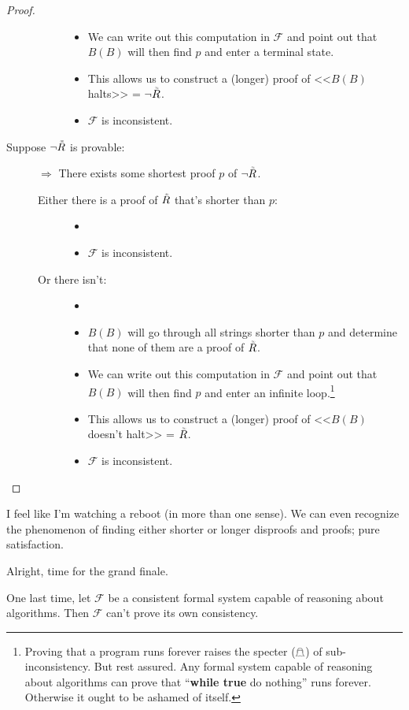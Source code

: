 \documentclass{article}
\theoremstyle{customstyle}
\newcommand{\F}{\ensuremath{\mathcal{F}}}
\newcommand{\iRosser}{\ensuremath{\accentset{\scalebox{0.35}{$\infty$}}{R}}}
\begin{document}
\begin{proof}
\begin{description}
\begin{description}
\begin{itemize}
\item We can write out this computation in $\F$ and point out that $B(B)$ will then find $p$ and enter a terminal state.
\item This allows us to construct a (longer) proof of <<$B(B)$ halts>> = $\neg \iRosser$.
\item $\F$ is inconsistent. \lightning
\end{itemize}
\end{description}
\item[Suppose $\neg \iRosser$ is provable:]
$\Rightarrow$ There exists some shortest proof $p$ of $\neg \iRosser$.
\begin{description}
\item[Either there is a proof of $\iRosser$ that's shorter than $p$:]
\begin{itemize}
\item[]
\item $\F$ is inconsistent. \lightning
\end{itemize}
\item[Or there isn't:]
\begin{itemize}
\item[]
\item $B(B)$ will go through all strings shorter than $p$ and determine that none of them are a proof of $\iRosser$.
\item We can write out this computation in $\F$ and point out that $B(B)$ will then find $p$ and enter an infinite loop.\footnote{Proving that a program runs forever raises the specter ($\mathghost$) of sub-inconsistency. But rest assured. Any formal system capable of reasoning about algorithms can prove that ``\textbf{while true} do nothing'' runs forever. Otherwise it ought to be ashamed of itself.}
\item This allows us to construct a (longer) proof of <<$B(B)$ doesn't halt>> = $\iRosser$.
\item $\F$ is inconsistent. \lightning
\end{itemize}
\end{description}
\end{description}
\end{proof}

I feel like I'm watching a reboot (in more than one sense). We can even recognize the phenomenon of finding either shorter or longer disproofs and proofs; pure satisfaction.

Alright, time for the grand finale.

\begin{theorem}
One last time, let $\F$ be a consistent formal system capable of reasoning about algorithms. Then $\F$ can't prove its own consistency.
\end{theorem}
\end{document}
